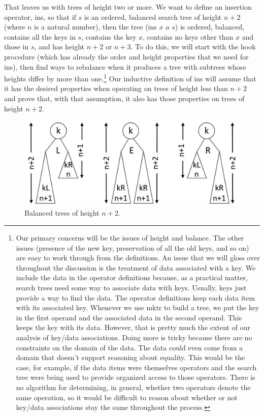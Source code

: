 That leaves us with trees of height two or more.
We want to define an insertion operator, \textsf{ins},
so that
if $s$ is an ordered, balanced search tree
of height $n+2$ (where $n$ is a natural number),
then the tree \textsf{(ins $x$ $a$ $s$)}
is ordered, balanced, contains all the keys in $s$,
contains the key $x$,
contains no keys other than $x$ and those in $s$,
and has height $n+2$ or $n+3$.
To do this,
we will start with the \textsf{hook} procedure
(which has already the order and height properties
that we need for \textsf{ins}),
then find ways to rebalance when it produces
a tree with subtrees whose heights differ by more than one.\footnote{Our
primary concerns will be the issues of height and balance.
The other issues
(presence of the new key, preservation of all the old keys,
and so on)
are easy to work through from the definitions.
An issue that we will gloss over throughout the discussion
is the treatment of data associated with a key.
We include the data in the operator definitions because,
as a practical matter, search trees need some way to
associate data with keys.
Usually, keys just provide a way to find the data.
The operator definitions keep each data item
with its associated key.
Whenever we use \textsf{mktr} to build a tree,
we put the key in the first operand
and the associated data in the second operand.
This keeps the key with its data.
However, that is pretty much the extent of
our analysis of key/data associations.
Doing more is tricky because there are no
constraints on the domain of the data.
The data could even come from a domain
that doesn't support reasoning about equality.
This would be the case, for example, if the data items
were themselves operators and the search tree
were being used to provide organized access to those
operators. There is no algorithm
for determining, in general, whether two operators
denote the same operation,
so it would be difficult to reason about whether or
not key/data associations stay the same throughout the process.}
Our inductive definition of \textsf{ins} will
assume that it has the desired properties
when operating on trees of height less than $n+2$
and prove that, with that assumption, it also
has those properties on trees of height $n+2$.

\begin{figure}
\begin{center}
\includegraphics[scale=1]{images-cmyk/ht2-or-more}
\end{center}
\caption{Balanced trees of height $n+2$.}
\label{fig:trees-of-ht-n+2}
\end{figure}

